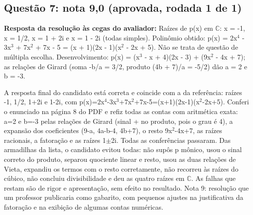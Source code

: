 \documentclass{article}%
\begin{document}
\subsection*{Questão 7: nota 9,0 (aprovada, rodada 1 de 1)}%
\textbf{Resposta da resolução às cegas do avaliador:} Raízes de p(x) em $\mathbb{C}$: x = -1, x = 1/2, x = 1 + 2i e x = 1 - 2i (todas simples).\newline%
\newline%
Polinômio obtido: p(x) = 2x$^{4}$ - 3x$^3$ + 7x$^2$ + 7x - 5 = (x + 1)(2x - 1)(x$^2$ - 2x + 5).\newline%
\newline%
Não se trata de questão de múltipla escolha. Desenvolvimento: p(x) = (x$^3$ - x + 4)(2x - 3) + (9x$^2$ - 4x + 7); as relações de Girard (soma -b/a = 3/2, produto (4b + 7)/a = -5/2) dão a = 2 e b = -3.\par %
A resposta final do candidato está correta e coincide com a da referência: raízes -1, 1/2, 1+2i e 1-2i, com p(x)=2x$^{4}$-3x$^3$+7x$^2$+7x-5=(x+1)(2x-1)(x$^2$-2x+5). Conferi o enunciado na página 8 do PDF e refiz todas as contas com aritmética exata: a=2 e b=-3 pelas relações de Girard (sinal + no produto, pois o grau é 4), a expansão dos coeficientes (9-a, 4a-b-4, 4b+7), o resto 9x$^2$-4x+7, as raízes racionais, a fatoração e as raízes 1$\pm$2i. Todas as conferências passaram. Das armadilhas da lista, o candidato evitou todas: não supôs p mônico, usou o sinal correto do produto, separou quociente linear e resto, usou as duas relações de Vieta, expandiu os termos com o resto corretamente, não recorreu às raízes do cúbico, não concluiu divisibilidade e deu as quatro raízes em $\mathbb{C}$. As falhas que restam são de rigor e apresentação, sem efeito no resultado. Nota 9: resolução que um professor publicaria como gabarito, com pequenos ajustes na justificativa da fatoração e na exibição de algumas contas numéricas.%
\end{document}
